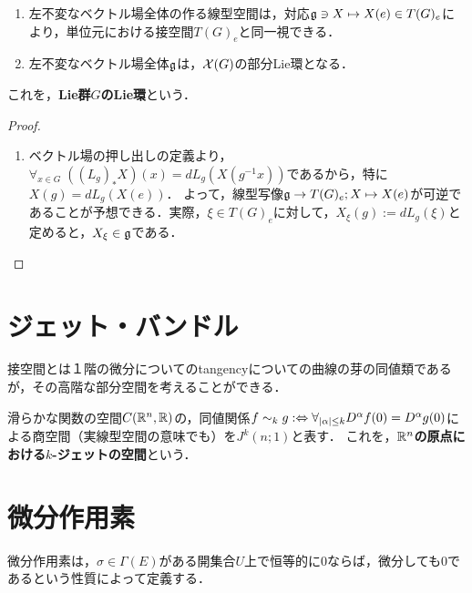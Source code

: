 \documentclass[uplatex,dvipdfmx]{jsreport}
\begin{document}
\begin{theorem}\mbox{}
    \begin{enumerate}
        \item 左不変なベクトル場全体の作る線型空間は，対応$\mathfrak{g}\ni X\mapsto X(e)\in T(G)_e$により，単位元における接空間$T(G)_e$と同一視できる．
        \item 左不変なベクトル場全体$\mathfrak{g}$は，$\mathcal{X}(G)$の部分Lie環となる．
    \end{enumerate}
    これを，\textbf{Lie群$G$のLie環}という．
\end{theorem}
\begin{proof}\mbox{}
    \begin{enumerate}
        \item ベクトル場の押し出しの定義より，$\forall_{x\in G}\;((L_g)_*X)(x)=dL_g(X(g^{-1}x))$であるから，特に$X(g)=dL_g(X(e))$．
        よって，線型写像$\mathfrak{g}\to T(G)_e;X\mapsto X(e)$が可逆であることが予想できる．実際，$\xi\in T(G)_e$に対して，$X_\xi(g):=dL_g(\xi)$と定めると，$X_\xi\in\mathfrak{g}$である．
    \end{enumerate}
\end{proof}

\section{ジェット・バンドル}

\begin{tcolorbox}[colframe=ForestGreen, colback=ForestGreen!10!white,breakable,colbacktitle=ForestGreen!40!white,coltitle=black,fonttitle=\bfseries\sffamily,
title=]
    接空間とは１階の微分についてのtangencyについての曲線の芽の同値類であるが，その高階な部分空間を考えることができる．
\end{tcolorbox}

\begin{definition}
    滑らかな関数の空間$C(\mathbb{R}^n,\mathbb{R})$の，同値関係$f\sim_kg:\Leftrightarrow \forall_{\lvert\alpha\rvert\le k}D^\alpha f(0)=D^\alpha g(0)$による商空間（実線型空間の意味でも）を$J^k(n;1)$と表す．
    これを，\textbf{$\mathbb{R}^n$の原点における$k$-ジェットの空間}という．
\end{definition}

\section{微分作用素}

\begin{tcolorbox}[colframe=ForestGreen, colback=ForestGreen!10!white,breakable,colbacktitle=ForestGreen!40!white,coltitle=black,fonttitle=\bfseries\sffamily,
title=]
    微分作用素は，$\sigma\in\Gamma(E)$がある開集合$U$上で恒等的に$0$ならば，微分しても$0$であるという性質によって定義する．
\end{tcolorbox}
\end{document}
